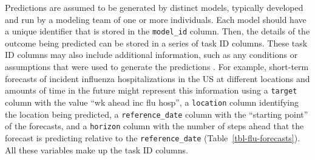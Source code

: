 \documentclass[
  article,
  shortnames,
  notitle]{jss}
\begin{document}
Predictions are assumed to be generated by distinct models, typically
developed and run by a modeling team of one or more individuals. Each
model should have a unique identifier that is stored in the
\texttt{model\_id} column. Then, the details of the outcome being
predicted can be stored in a series of task ID columns. These task ID
columns may also include additional information, such as any conditions
or assumptions that were used to generate the predictions
\citep{hubverse_docs}. For example, short-term forecasts of incident
influenza hospitalizations in the US at different locations and amounts
of time in the future might represent this information using a
\texttt{target} column with the value ``wk ahead inc flu hosp'', a
\texttt{location} column identifying the location being predicted, a
\texttt{reference\_date} column with the ``starting point'' of the
forecasts, and a \texttt{horizon} column with the number of steps ahead
that the forecast is predicting relative to the \texttt{reference\_date}
(Table~\ref{tbl-flu-forecasts}). All these variables make up the task ID
columns.
\end{document}
